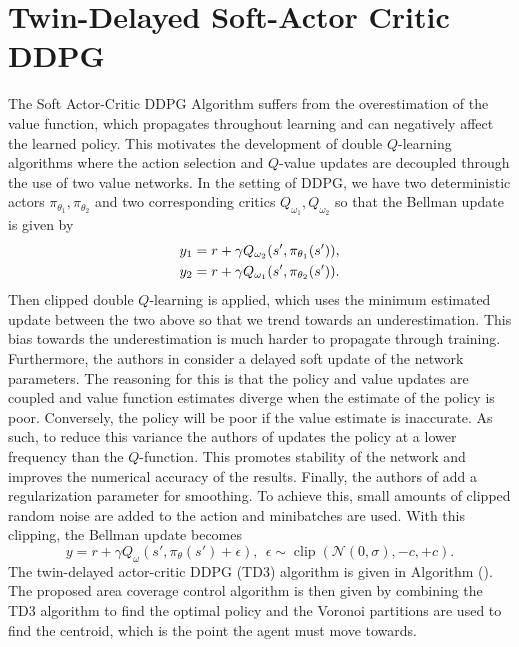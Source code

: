 \documentclass[10pt,conference]{IEEEtran}
\DeclareMathOperator{\Clip}{clip}
\begin{document}
\section{Twin-Delayed Soft-Actor Critic DDPG}
The Soft Actor-Critic DDPG Algorithm suffers from the overestimation of the value function, which propagates throughout learning and can negatively affect the learned policy. This motivates the development of double $Q$-learning algorithms where the action selection and $Q$-value updates are decoupled through the use of two value networks. In the setting of DDPG, we have two deterministic actors $\pi_{\theta_1}, \pi_{\theta_2}$ and two corresponding critics $Q_{\omega_1}, Q_{\omega_2}$ so that the Bellman update is given by 
\begin{align*}
	\displaystyle &y_1 = r + \gamma Q_{\omega_2}(s', \pi_{\theta_1}(s')), \\
	&y_2 = r + \gamma Q_{\omega_1}(s', \pi_{\theta_2}(s')).
\end{align*}
Then clipped double $Q$-learning is applied, which uses the minimum estimated update between the two above so that we trend towards an underestimation. This bias towards the underestimation is much harder to propagate through training. Furthermore, the authors in \cite{fujimoto2018addressing} consider a delayed soft update of the network parameters. The reasoning for this is that the policy and value updates are coupled and value function estimates diverge when the estimate of the policy is poor. Conversely, the policy will be poor if the value estimate is inaccurate. As such, to reduce this variance the authors of \cite{fujimoto2018addressing} updates the policy at a lower frequency than the $Q$-function. This promotes stability of the network and improves the numerical accuracy of the results. Finally, the authors of \cite{fujimoto2018addressing} add a regularization parameter for smoothing. To achieve this, small amounts of clipped random noise are added to the action and minibatches are used. With this clipping, the Bellman update becomes 
\begin{equation*}
	\displaystyle y = r + \gamma Q_\omega(s', \pi_{\theta}(s') + \epsilon), \:\: \epsilon \sim \Clip(\mathcal{N}(0, \sigma), -c, +c).
\end{equation*}
The twin-delayed actor-critic DDPG (TD3) algorithm is given in Algorithm (). The proposed area coverage control algorithm is then given by combining the TD3 algorithm to find the optimal policy and the Voronoi partitions are used to find the centroid, which is the point the agent must move towards. 
\end{document}
